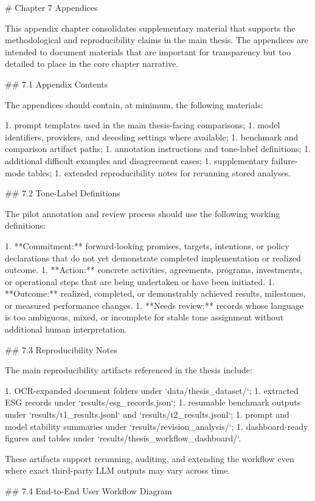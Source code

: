 # Chapter 7 Appendices

This appendix chapter consolidates supplementary material that supports the methodological and reproducibility claims in the main thesis. The appendices are intended to document materials that are important for transparency but too detailed to place in the core chapter narrative.

## 7.1 Appendix Contents

The appendices should contain, at minimum, the following materials:

1. prompt templates used in the main thesis-facing comparisons;
1. model identifiers, providers, and decoding settings where available;
1. benchmark and comparison artifact paths;
1. annotation instructions and tone-label definitions;
1. additional difficult examples and disagreement cases;
1. supplementary failure-mode tables;
1. extended reproducibility notes for rerunning stored analyses.

## 7.2 Tone-Label Definitions

The pilot annotation and review process should use the following working definitions:

1. **Commitment:** forward-looking promises, targets, intentions, or policy declarations that do not yet demonstrate completed implementation or realized outcome.
1. **Action:** concrete activities, agreements, programs, investments, or operational steps that are being undertaken or have been initiated.
1. **Outcome:** realized, completed, or demonstrably achieved results, milestones, or measured performance changes.
1. **Needs review:** records whose language is too ambiguous, mixed, or incomplete for stable tone assignment without additional human interpretation.

## 7.3 Reproducibility Notes

The main reproducibility artifacts referenced in the thesis include:

1. OCR-expanded document folders under `data/thesis_dataset/`;
1. extracted ESG records under `results/esg_records.json`;
1. resumable benchmark outputs under `results/t1_results.jsonl` and `results/t2_results.jsonl`;
1. prompt and model stability summaries under `results/revision_analysis/`;
1. dashboard-ready figures and tables under `results/thesis_workflow_dashboard/`.

These artifacts support rerunning, auditing, and extending the workflow even where exact third-party LLM outputs may vary across time.

## 7.4 End-to-End User Workflow Diagram

